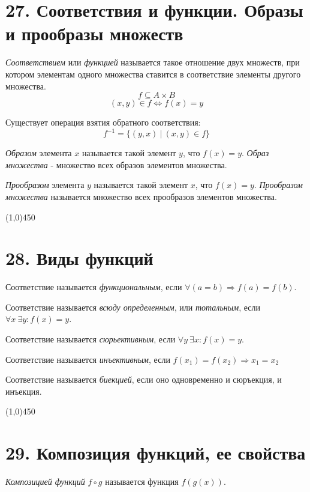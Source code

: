 \documentclass[a4paper,12pt]{article}
\begin{document}
	\section*{27. Соответствия и функции. Образы и прообразы множеств}
	\textit{Соответствием} или \textit{функцией} называется такое отношение двух множеств, при котором элементам одного множества ставится в соответствие элементы другого множества.
	\[
	f \subseteq A \times B
	\]
	\[
	(x, y) \in f \Leftrightarrow f(x) = y
	\]

	Существует операция взятия обратного соответствия:
	\[
	f^{-1} = \{(y, x) \ | \ (x, y) \in f \}
	\]

	\textit{Образом} элемента $x$ называется такой элемент $y$, что $f(x) = y$. \textit{Образ множества} - множество всех образов элементов множества.

	\textit{Прообразом} элемента $y$ называется такой элемент $x$, что $f(x) = y$. \textit{Прообразом множества} называется множество всех прообразов элементов множества.

	\begin{center}
		\line(1,0){450}
	\end{center}

	\section*{28. Виды функций}
	Соответствие называется \textit{функциональным}, если $\forall (a = b) \Rightarrow f(a) = f(b)$.

	Соответствие называется \textit{всюду определенным}, или \textit{тотальным}, если $\forall x \  \exists y: f(x) = y$.

	Соответствие называется \textit{сюрьективным}, если $\forall y \ \exists x: f(x) = y$.

	Соответствие называется \textit{инъективным}, если $f(x_1) = f(x_2) \Rightarrow x_1 = x_2$

	Соответствие называется \textit{биекцией}, если оно одновременно и сюръекция, и инъекция.

	\begin{center}
		\line(1,0){450}
	\end{center}

	\section*{29. Композиция функций, ее свойства}
	\textit{Композицией функций} $f \circ g$ называется функция $f(g(x))$.
\end{document}
